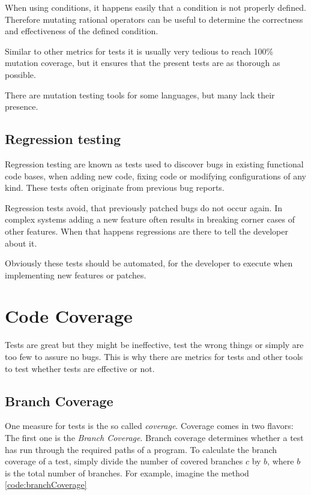 When using conditions, it happens easily that a condition is not properly
defined. Therefore mutating rational operators can be useful to determine the
correctness and effectiveness of the defined condition.

Similar to other metrics for tests it is usually very tedious to reach 100\%
mutation coverage, but it ensures that the present tests are as thorough as
possible.

There are mutation testing tools for some languages, but many lack their
presence.

\cite{mutation_testing}

\subsection{Regression testing}

Regression testing are known as tests used to discover bugs in existing
functional code bases, when adding new code, fixing code or modifying
configurations of any kind. These tests often originate from previous bug
reports.

Regression tests avoid, that previously patched bugs do not occur again. In
complex systems adding a new feature often results in breaking corner cases of
other features. When that happens regressions are there to tell the developer
about it.

Obviously these tests should be automated, for the developer to execute when
implementing new features or patches.

\section{Code Coverage}

Tests are great but they might be ineffective, test the wrong things
or simply are too few to assure no bugs. This is why there are metrics
for tests and other tools to test whether tests are effective or not.

\subsection{Branch Coverage}

One measure for tests is the so called \textit{coverage}. Coverage
comes in two flavors: The first one is the \textit{Branch Coverage}.
Branch coverage determines whether a test has run through the
required paths of a program. To calculate the branch coverage of a test,
simply divide the number of covered branches $c$ by $b$, where $b$ is the
total number of branches. For example, imagine the method \ref{code:branchCoverage}

